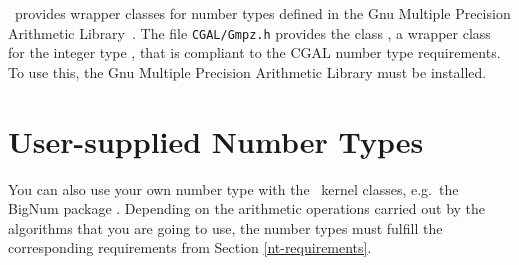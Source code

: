 \cgal\ provides wrapper classes for number types defined in the
{\sc Gnu} Multiple Precision Arithmetic Library~\cite{g-gmpal-96}.
The file {\tt  CGAL/Gmpz.h} provides the class ,
a wrapper class for the integer type , that is compliant to the
CGAL number type requirements.
To use this, the {\sc Gnu} Multiple Precision Arithmetic Library must be
installed.


\section{User-supplied Number Types}

You can also use your own number type with the \cgal\ kernel
classes, e.g.\  the {\sc BigNum} package \cite{svh-bpepa-89}.
Depending on the arithmetic operations carried out by the algorithms
that you are going to use, the number types must fulfill the
corresponding requirements from Section \ref{nt-requirements}. 

